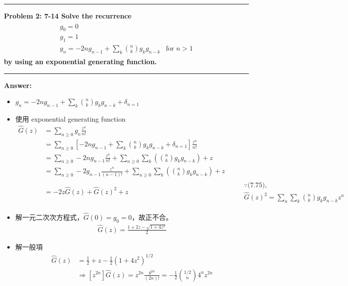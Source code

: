 \documentclass[11pt,fleqn]{article}
\newcommand\question[2]{\vspace{.25in}\hrule\textbf{#1: #2}\vspace{.5em}\hrule\vspace{.10in}}
\renewcommand\part[1]{\vspace{.10in}\textbf{#1}}
\begin{document}
\question{Problem 2} {7-14 Solve the recurrence
	\begin{align*}
	\begin{matrix}
	g_0 = 0 & \\ 
	g_1 = 1 & \\
 	g_n = -2n g_{n-1} + \sum_{k} \binom{n}{k} g_k g_{n-k} & \text{for } n > 1
	\end{matrix}
	\end{align*}
	by using an exponential generating function.
}

\part{Answer:}

\begin{itemize}
	\item $g_n = -2n g_{n-1} + \sum_{k} \binom{n}{k} g_k g_{n-k} + \delta_{n=1}$
	\item 使用 exponential generating function
		\begin{align*}
			\widehat{G}(z) 
				&= \sum_{n \ge 0} g_n \frac{z^n}{n!} \\
				&= \sum_{n \ge 0} \left [ -2n g_{n-1} + \sum_{k} \binom{n}{k} g_k g_{n-k} + \delta_{n=1} \right ] \frac{z^n}{n!} \\
				&= \sum_{n \ge 0} -2n g_{n-1} \frac{z^n}{n!} + \sum_{n \ge 0} \sum_{k} \left ( \binom{n}{k} g_k g_{n-k} \right ) + z \\
				&= \sum_{n \ge 0} -2 g_{n-1} \frac{z^n}{(n-1)!} + \sum_{n \ge 0} \sum_{k} \left ( \binom{n}{k} g_k g_{n-k} \right ) + z\\
				&= -2 z \widehat{G}(z) + \widehat{G}(z)^2 + z &&
					\begin{aligned}
						&\because\text{(7.75), }\\ 
						&\widehat{G}(z)^2 = \sum_n \sum_k \binom{n}{k} g_k g_{n-k} z^n
					\end{aligned}
		\end{align*}
	\item 解一元二次次方程式，$\widehat{G}(0)= g_0 = 0$，故正不合。
		\begin{align*}
			\widehat{G}(z) = \frac{1+2z-\sqrt{1+4z^2}}{2}
		\end{align*}
	\item 解一般項 
		\begin{align*}
			\widehat{G}(z) &= \frac{1}{2} + z - \frac{1}{2}(1+4z^2)^{1/2} \\
			& \Rightarrow [z^{2n}] \widehat{G}(z) = z^{2n} \frac{g^{2n}}{(2n)!} = - \frac{1}{2} \binom{1/2}{n} 4^n z^{2n} 

\end{align*}
\end{itemize}
\end{document}
